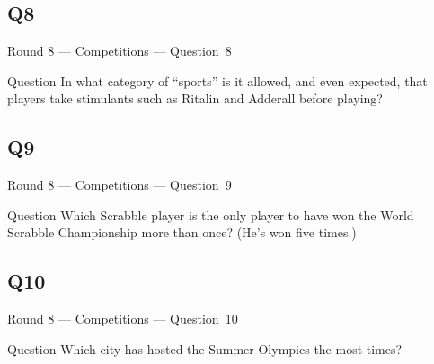 \documentclass[11pt]{beamer}
\begin{document}
\subsection*{Q8}
\begin{frame}[t]{Round 8 --- Competitions --- \mbox{Question 8}}
\vspace{-0.5em}
\begin{block}{Question}
In what category of ``sports'' is it allowed, and even expected, that players take stimulants such as Ritalin and Adderall before playing?
\end{block}
\end{frame}
\subsection*{Q9}
\begin{frame}[t]{Round 8 --- Competitions --- \mbox{Question 9}}
\vspace{-0.5em}
\begin{block}{Question}
Which Scrabble player is the only player to have won the World Scrabble Championship more than once? (He's won five times.)
\end{block}
\end{frame}
\subsection*{Q10}
\begin{frame}[t]{Round 8 --- Competitions --- \mbox{Question 10}}
\vspace{-0.5em}
\begin{block}{Question}
Which city has hosted the Summer Olympics the most times?
\end{block}
\end{frame}
\end{document}
